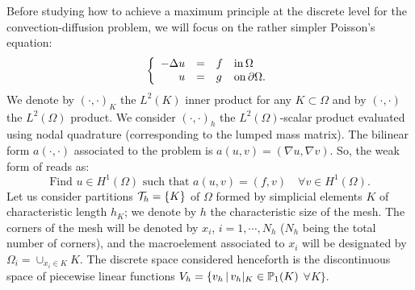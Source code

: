 Before studying how to achieve a maximum principle at the discrete level for the convection-diffusion problem, we will focus on the rather simpler Poisson's equation:
\begin{equation}
\label{eq-spoisson}
\left\{
\begin{array}{rcll}
\displaystyle - \Delta u & = & f & \rm{in}\, \Omega \\
u&=&g &\rm{on}\, \partial\Omega.\\
\end{array}\right.
\end{equation}
We denote by $(\cdot,\cdot)_K$ the $L^2(K)$ inner product for any $K\subset \Omega$ and by $(\cdot,\cdot)$ the $L^2(\Omega)$ product. We consider $(\cdot,\cdot)_h$ the $L^2(\Omega)$-scalar product evaluated using nodal quadrature (corresponding to the lumped mass matrix). The bilinear form $a(\cdot,\cdot)$ associated to the problem  is $a(u,v) = ( \nabla u,\nabla v)$. So, the weak form of  reads as: 
\begin{equation}
\label{weakform}
\textrm{{Find $u\in H^1(\Omega)$ such that }} a(u,v)=(f,v) \quad \forall v \in H^1(\Omega).
\end{equation}
Let us consider partitions $\mathcal{T}_h = \{K\}$ of $\Omega$ formed by simplicial elements $K$ of characteristic length $h_K$; we denote by $h$ the characteristic size of the mesh. The corners of the mesh will be denoted by $x_i$, $i=1,\cdots, N_h$ ($N_h$ being the total number of corners), and the macroelement associated to $x_i$ will be designated by $\Omega_i = \cup_{x_i\in  K}K$. %
 The discrete space considered henceforth is the discontinuous space of piecewise linear functions $ V_h=\{v_h \, | \, v_h|_K \in \mathbb{P}_1(K)$ $\forall K\}$.  %
